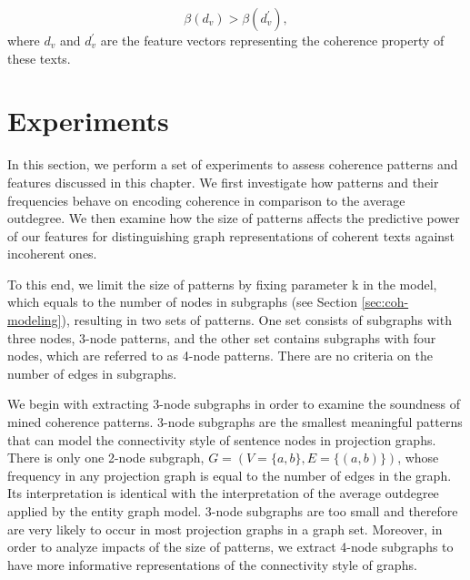 \begin{equation}
\beta (d_v) > \beta (d^\prime_v),
\end{equation}
where $d_v$ and $d^\prime_v$ are the feature vectors representing the coherence property of these texts. 

\section{Experiments}
\label{sec:exp}

In this section, we perform a set of experiments to assess coherence patterns and features discussed in this chapter. 
We first investigate how patterns and their frequencies behave on encoding coherence in comparison to the average outdegree.  
We then examine how the size of patterns affects the predictive power of our features for distinguishing graph representations of coherent texts against incoherent ones. 

To this end, we limit the size of patterns by fixing parameter k in the model, which equals to the number of nodes in subgraphs (see Section \ref{sec:coh-modeling}), resulting in two sets of patterns. 
One set consists of subgraphs with three nodes, 3-node patterns, and the other set contains subgraphs with four nodes, which are referred to as 4-node patterns.  
There are no criteria on the number of edges in subgraphs.  

We begin with extracting 3-node subgraphs in order to examine the soundness of mined coherence patterns.  
3-node subgraphs are the smallest meaningful patterns that can model the connectivity style of sentence nodes in projection graphs. 
There is only one 2-node subgraph, $G = \left( V = \lbrace a,b \rbrace, E=\lbrace \left( a, b \right) \rbrace \right)$, whose frequency in any projection graph is equal to the number of edges in the graph. 
Its interpretation is identical with the interpretation of the average outdegree applied by the entity graph model.  
3-node subgraphs are too small and therefore are very likely to occur in most projection graphs in a graph set. 
Moreover, in order to analyze impacts of the size of patterns, we extract 4-node subgraphs to have more informative representations of the connectivity style of graphs. 

